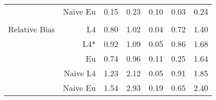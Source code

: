 \documentclass[a4paper,12pt,twoside]{book}
\begin{document}
\begin{table}[H]
\begin{tabular}{crrrrrr}
&Naive Eu &0.15 & 0.23 & 0.10 & 0.03 & 0.24 \\ 
  \\
   \hline
   
{\color{blue} Relative Bias } & L4  &0.80 & 1.02 & 0.04 & 0.72 & 1.40 \\ 

&L4*  &  0.92 & 1.09 & 0.05 & 0.86 & 1.68 \\ 
 
  
&Eu &  
    0.74 & 0.96 & 0.11 & 0.25 & 1.64 \\ 
 
  
&Naive L4&  
  
1.23 & 2.12 & 0.05 & 0.91 & 1.85 \\ 
 
  
  
&Naive Eu &  
 1.54 & 2.93 & 0.19 & 0.65 & 2.40 \\ 
  
\end{tabular}

\end{table}
\end{document}
